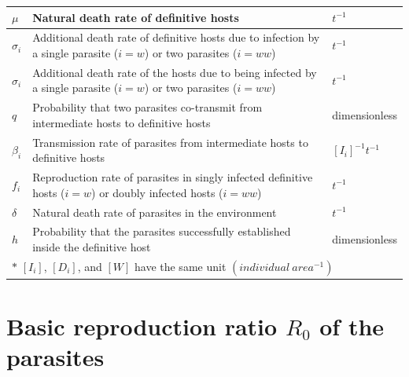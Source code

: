 \documentclass[a4paper]{scrartcl}
\begin{document}
\begin{table}[!ht]
\begin{tabular}{p{2cm}|p{10cm}|p{3cm}}
\hline
$\mu$ & Natural death rate of definitive hosts & $t^{-1}$ \\
\hline
$\sigma_i$ & Additional death rate of definitive hosts due to infection by a single parasite ($i = w$) or two parasites ($i = ww$) & $t^{-1}$ \\
\hline
$\sigma_i$ & Additional death rate of the hosts due to being infected by a single parasite ($i = w$) or two parasites ($i = ww$) & $t^{-1}$\\
\hline
$q$ & Probability that two parasites co-transmit from intermediate hosts to definitive hosts & dimensionless \\
\hline
$\beta_i$ & Transmission rate of parasites from intermediate hosts to definitive hosts & $[I_i]^{-1} t^{-1}$\\
\hline
$f_i$ & Reproduction rate of parasites in singly infected definitive hosts ($i = w$) or doubly infected hosts ($i = ww$) &  $t^{-1}$ \\
\hline
$\delta$ & Natural death rate of parasites in the environment & $t^{-1}$ \\
\hline 
$h$ & Probability that the parasites successfully established inside the definitive host &  dimensionless \\
\hline
\multicolumn{3}{l}{$*$ $[I_i]$, $[D_i]$, and $[W]$ have the same unit $(individual \ area^{-1})$}
\end{tabular}
\end{table}


\section*{Basic reproduction ratio $R_0$ of the parasites}
\end{document}
